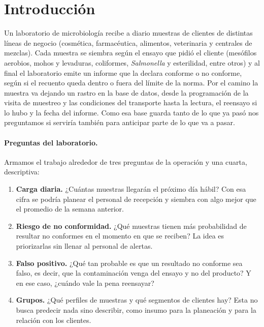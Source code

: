 \section{Introducción}
\label{sec:introduccion}

Un laboratorio de microbiología recibe a diario muestras de clientes de
distintas líneas de negocio (cosmética, farmacéutica, alimentos, veterinaria y
centrales de mezclas). Cada muestra se siembra según el ensayo que pidió el
cliente (mesófilos aerobios, mohos y levaduras, coliformes,
\textit{Salmonella} y esterilidad, entre otros) y al final el laboratorio
emite un informe que la declara conforme o no conforme, según si el recuento
queda dentro o fuera del límite de la norma. Por el camino la muestra va
dejando un rastro en la base de datos, desde la programación de la visita de
muestreo y las condiciones del transporte hasta la lectura, el reensayo si lo
hubo y la fecha del informe. Como esa base guarda tanto de lo que ya pasó nos
preguntamos si serviría también para anticipar parte de lo que va a pasar.

\paragraph{Preguntas del laboratorio.} Armamos el trabajo alrededor de tres
preguntas de la operación y una cuarta, descriptiva:

\begin{enumerate}[label=\alph*.]
    \item \textbf{Carga diaria.} ¿Cuántas muestras llegarán el próximo día
          hábil? Con esa cifra se podría planear el personal de recepción y
          siembra con algo mejor que el promedio de la semana anterior.
    \item \textbf{Riesgo de no conformidad.} ¿Qué muestras tienen más
          probabilidad de resultar no conformes en el momento en que se
          reciben? La idea es priorizarlas sin llenar al personal de alertas.
    \item \textbf{Falso positivo.} ¿Qué tan probable es que un resultado no
          conforme sea falso, es decir, que la contaminación venga del ensayo
          y no del producto? Y en ese caso, ¿cuándo vale la pena reensayar?
    \item \textbf{Grupos.} ¿Qué perfiles de muestras y qué segmentos de
          clientes hay? Esta no busca predecir nada sino describir, como
          insumo para la planeación y para la relación con los clientes.
\end{enumerate}

